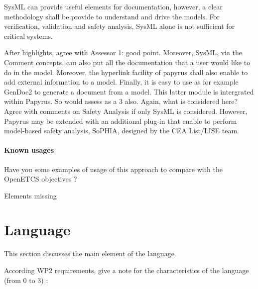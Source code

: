 \begin{assessor2}
SysML can provide useful elements for documentation, however, a clear methodology shall be provide to understand and drive the models. For verification, validation and safety analysis, SysML alone is not sufficient for critical systems. 
\end{assessor2}

\begin{author_comment}
After highlights, agree with Assessor 1: good point.
Moreover, SysML, via the Comment concepts, can also put all the documentation that a user would like to do in the model. Moreover, the hyperlink facility of papyrus shall also enable to add external information to a model. Finally, it is easy to use as for example GenDoc2 to generate a document from a model. This latter module is intergrated within Papyrus.
So would assess as a 3 also.
Again, what is considered here? Agree with comments on Safety Analysis if only SysML is considered. However, Papyrus may be extended with an additional plug-in that enable to perform model-based safety analysis, SoPHIA, designed by the CEA List/LISE team.
\end{author_comment}

\paragraph{Known usages} Have you some examples of usage of this approach to compare with the OpenETCS objectives ?

\begin{assessor2}
Elements missing
\end{assessor2}


\section{Language}
This section discusses the main element of the language.

According WP2 requirements, give a note for the characteristics of the language (from 0 to 3) :

